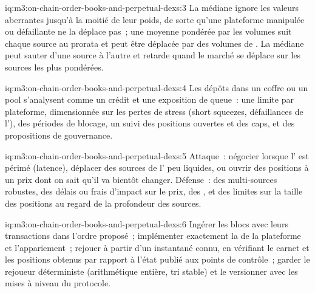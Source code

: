 \begin{solution}{iq:m3:on-chain-order-books-and-perpetual-dexs:3}
La médiane ignore les valeurs aberrantes jusqu'à la moitié de leur poids, de sorte qu'une plateforme manipulée ou défaillante ne la déplace pas~; une moyenne pondérée par les volumes suit chaque
source au prorata et peut être déplacée par des volumes de . La médiane peut sauter d'une source à l'autre et retarde quand le marché se déplace sur les
sources les plus pondérées.
\end{solution}

\begin{solution}{iq:m3:on-chain-order-books-and-perpetual-dexs:4}
Les dépôts dans un coffre ou un pool s'analysent comme un crédit et une exposition de queue~: une limite par plateforme, dimensionnée sur les pertes de stress (short squeezes, défaillances de l'), des périodes de blocage,
un suivi des positions ouvertes et des caps, et des propositions de gouvernance.
\end{solution}

\begin{solution}{iq:m3:on-chain-order-books-and-perpetual-dexs:5}
Attaque~: négocier lorsque l' est périmé (latence), déplacer des sources de l' peu liquides, ou ouvrir des positions à un prix dont on sait qu'il va bientôt changer. Défense~:
des  multi-sources robustes, des délais ou frais d'impact sur le prix, des , et des limites sur la taille des positions au regard de la profondeur des sources.
\end{solution}

\begin{solution}{iq:m3:on-chain-order-books-and-perpetual-dexs:6}
Ingérer les blocs avec leurs transactions dans l'ordre proposé~; implémenter exactement la  de la plateforme et l'appariement~; rejouer à partir d'un instantané connu,
en vérifiant le carnet et les positions obtenus par rapport à l'état publié aux points de contrôle~; garder le rejoueur déterministe (arithmétique entière, tri
stable) et le versionner avec les mises à niveau du protocole.
\end{solution}
